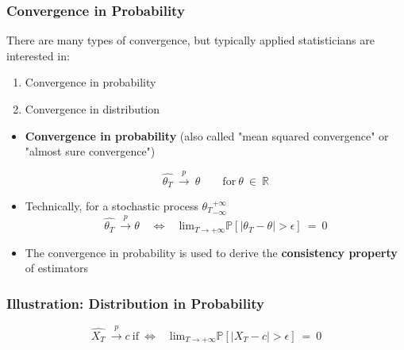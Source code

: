 \documentclass{beamer}
\begin{document}
  \begin{frame}
    \frametitle{Convergence in Probability}
    There are many types of convergence, but typically applied statisticians are interested in:
   
    \begin{enumerate}
      \item Convergence in probability
      \item Convergence in distribution
    \end{enumerate}

    \begin{itemize}
\item  \textbf{Convergence in probability} (also called "mean squared convergence" or "almost sure convergence")

  \begin{equation*}
    \hat{\theta_T} \ \overset{p}{\to} \ \theta \qquad \text{for} \ \theta \ \in \ \mathbb{R}
  \end{equation*}

\item Technically, for a stochastic process ${\theta_T}_{-\infty}^ {+\infty}$
  \begin{equation*}
  \hat{\theta_T} \ \overset{p}{\to} \theta \quad \Leftrightarrow \quad \text{lim}_{T \to +\infty} \mathbb{P} \left[ |\theta_T - \theta| > \epsilon \right] \ = \ 0 
  \end{equation*}
    
\item The convergence in probability is used to derive the \textbf{consistency property} of estimators
    \end{itemize}
    
  \end{frame}


  \begin{frame}
    \frametitle{Illustration: Distribution in Probability}
    
    \begin{equation*}
\hat{X_T} \ \overset{p}{\to} c \ \text{if} \ \Leftrightarrow \quad \text{lim}_{T \to +\infty} \mathbb{P} \left[ |X_T - c| > \epsilon \right] \ = \ 0      
    \end{equation*}

    
    
  \end{frame}
\end{document}
